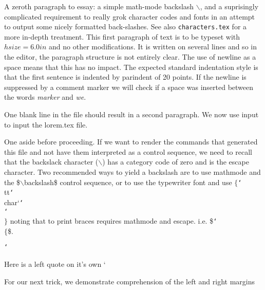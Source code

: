 
\hsize=6.0in

A zeroth paragraph to essay: a simple math-mode backslash $ \backslash $, 
and a suprisingly complicated requirement to really grok character codes
and fonts in an attempt to output some nicely formatted back-slashes.
See also {\tt characters.tex} for a more in-depth treatment.
\smallskip
This first paragraph of text is to be typeset with $hsize=6.0in$ and no other modifications.
It is written on
several
lines
and 
so
in the editor, the paragraph structure is not entirely clear.
The
use
of newline as a space means that this has no impact.
The expected standard indentation style is that the first sentence is indented by 
parindent of 20 points.
If the newline is suppressed by a comment marker%
we will check if a space was inserted between the words {\it marker} and {\it we}.

One blank line in the file should result in a second paragraph.
We now use input to input the lorem.tex file.


\def\bsm{$\backlash $}
\def\bst{{\tt\char`\\}}

One aside before proceeding. If we want to render the commands that generated this
file and not have them interpreted as a control sequence, we need to recall that the
backslack character ($\backslash $) has a category code of zero and is the escape 
character.  Two recommended ways to yield a backslash are to use mathmode and the
\$$\backslash$backslash\$ control sequence, or to use the typewriter font and
use $\{$\bst tt\bst char{`}\bst\bst$\}$ noting that to print braces requires
mathmode and escape. i.e. \$\bst$\{$\$.

\bst

Here is a left quote on it's own ` 

For our next trick, we demonstrate comprehension of the left and right margins

\bye
